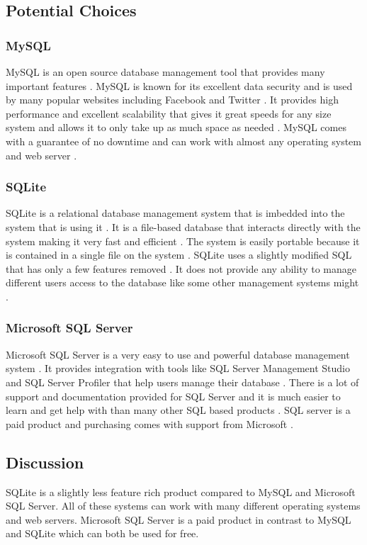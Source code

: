\documentclass[onecolumn, draftclsnofoot,10pt, compsoc]{IEEEtran}
\begin{document}
\subsection{Potential Choices}

\subsubsection{MySQL}
MySQL is an open source database management tool that provides many important features \cite{mysql}. MySQL is known for its excellent data security and is used by many popular websites including Facebook and Twitter \cite{mysql}. It provides high performance and excellent scalability that gives it great speeds for any size system and allows it to only take up as much space as needed \cite{mysql}. MySQL comes with a guarantee of no downtime and can work with almost any operating system and web server \cite{mysql}.

\subsubsection{SQLite}
SQLite is a relational database management system that is imbedded into the system that is using it \cite{sqlite}. It is a file-based database that interacts directly with the system making it very fast and efficient \cite{sqlite}. The system is easily portable because it is contained in a single file on the system \cite{sqlite}. SQLite uses a slightly modified SQL that has only a few features removed \cite{sqlite}. It does not provide any ability to manage different users access to the database like some other management systems might \cite{sqlite}.

\subsubsection{Microsoft SQL Server}
Microsoft SQL Server is a very easy to use and powerful database management system \cite{sqlserver}. It provides integration with tools like SQL Server Management Studio and SQL Server Profiler that help users manage their database \cite{sqlserver}. There is a lot of support and documentation provided for SQL Server and it is much easier to learn and get help with than many other SQL based products \cite{sqlserver}. SQL server is a paid product and purchasing comes with support from Microsoft \cite{sqlserver}.

\subsection{Discussion}
SQLite is a slightly less feature rich product compared to MySQL and Microsoft SQL Server. All of these systems can work with many different operating systems and web servers. Microsoft SQL Server is a paid product in contrast to MySQL and SQLite which can both be used for free.
\end{document}
